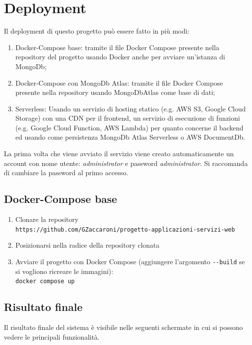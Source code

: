\documentclass[italian]{report}
\begin{document}
\chapter{Deployment}
Il deployment di questo progetto può essere fatto in più modi:
\begin{enumerate}
    \item Docker-Compose base: tramite il file Docker Compose presente nella repository del progetto usando Docker anche per avviare un'istanza di MongoDb;
    \item Docker-Compose con MongoDb Atlas: tramite il file Docker Compose presente nella repository usando MongoDbAtlas come base di dati;
    \item Serverless: Usando un servizio di hosting statico (e.g. AWS S3, Google Cloud Storage) con una CDN per il frontend, un servizio di esecuzione di funzioni (e.g. Google Cloud Function, AWS Lambda) per quanto concerne il backend ed usando come persistenza MongoDb Atlas Serverless o AWS DocumentDb.
\end{enumerate}
La prima volta che viene avviato il servizio viene creato automaticamente un account con nome utente: \emph{administrator} e password \emph{administrator}. Si raccomanda di cambiare la password al primo accesso. 
\section{Docker-Compose base}
\begin{enumerate}
    \item Clonare la repository \\
        \lstinline{https://github.com/GZaccaroni/progetto-applicazioni-servizi-web}
    \item Posizionarsi nella radice della repository clonata
    \item Avviare il progetto con Docker Compose (aggiungere l'argomento \lstinline{--build} se si vogliono ricreare le immagini): \\
        \lstinline{docker compose up}
\end{enumerate}
\section{Risultato finale}
Il risultato finale del sistema è visibile nelle seguenti schermate in cui si possono vedere le principali funzionalità.
\end{document}
